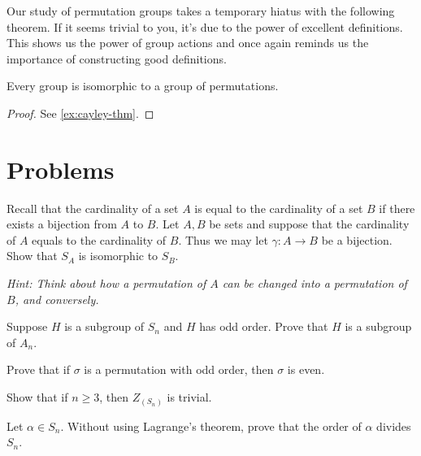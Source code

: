 \documentclass[./main.tex]{subfiles}
\begin{document}
Our study of permutation groups takes a temporary hiatus with the following
theorem. If it seems trivial to you, it's due to the power of excellent
definitions. This shows us the power of group actions and once again reminds us
the importance of constructing good definitions.
\begin{theorem}
    Every group is isomorphic to a group of permutations. 
\end{theorem}
\begin{proof}
    See \cref{ex:cayley-thm}.
\end{proof}


\section{Problems}

\begin{exercise}
\label{exercise:permutation-group-only-depends-on-cardinality}
    Recall that the cardinality of a set $A$ is equal to the cardinality of a
    set $B$ if there exists a bijection from $A$ to $B$. Let $A, B$ be sets and
    suppose that the cardinality of $A$ equals to the cardinality of $B$. Thus
    we may let $\gamma: A \to B$ be a bijection. Show that $S_A$ is isomorphic
    to $S_B$.

    \textit{Hint: Think about how a permutation of $A$ can be changed into a permutation of $B$, and conversely.}
\end{exercise}

\begin{exercise}
    Suppose $H$ is a subgroup of $S_n$ and $H$ has odd order. Prove that $H$ is
    a subgroup of $A_n$.
\end{exercise}

\begin{exercise}
    Prove that if $\sigma$ is a permutation with odd order, then $\sigma$ is
    even.
\end{exercise}

\begin{exercise}
    Show that if $n \geq 3$, then $Z_(S_n)$ is trivial. 
\end{exercise}

\begin{exercise}
    Let $\alpha \in S_n$. Without using Lagrange's theorem, prove that the order
    of $\alpha$ divides $S_n$. 
\end{exercise}
\end{document}
